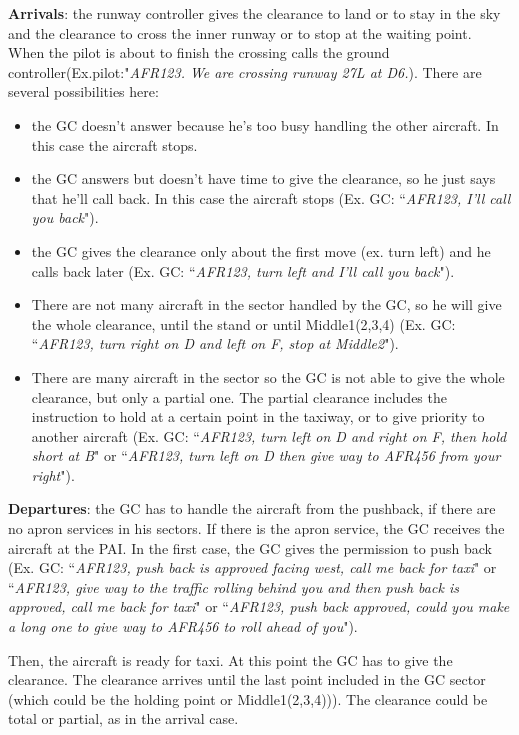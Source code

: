 \documentclass{article}
\begin{document}
\textbf{Arrivals}: the runway controller gives the clearance to land or to stay in the sky and the clearance to cross the inner runway or to stop at the waiting point. When the pilot is about to finish the crossing calls the ground controller(Ex.pilot:"\textit{AFR123. We are crossing runway 27L at D6.}). There are several possibilities here:
\begin{itemize}
	\item the GC doesn't answer because he's too busy handling the other aircraft. In this case the aircraft stops.
	\item the GC answers but doesn't have time to give the clearance, so he just says that he'll call back. In this case the aircraft stops (Ex. GC: ``\textit{AFR123, I'll call you back}").
	\item the GC gives the clearance only about the first move (ex. turn left) and he calls back later (Ex. GC: ``\textit{AFR123, turn left and I'll call you back}").
	\item There are not many aircraft in the sector handled by the GC, so he will give the whole clearance, until the stand or until Middle1(2,3,4) (Ex. GC: ``\textit{AFR123, turn right on D and left on F, stop at Middle2}").
	\item There are many aircraft in the sector so the GC is not able to give the whole clearance, but only a partial one. The partial clearance includes the instruction to hold at a certain point in the taxiway, or to give priority to another aircraft (Ex. GC: ``\textit{AFR123, turn left on D and right on F, then hold short at B}" or ``\textit{AFR123, turn left on D then give way to AFR456 from your right}").
\end{itemize}

\textbf{Departures}: the GC has to handle the aircraft from the pushback, if there are no apron services in his sectors. If there is the apron service, the GC receives the aircraft at the PAI. 
In the first case, the GC gives the permission to push back (Ex. GC: ``\textit{AFR123, push back is approved facing west, call me back for taxi}" or ``\textit{AFR123, give way to the traffic rolling behind you and then push back is approved, call me back for taxi}" or ``\textit{AFR123, push back approved, could you make a long one to give way to AFR456 to roll ahead of you}"). 

Then, the aircraft is ready for taxi. At this point the GC has to give the clearance. The clearance arrives until the last point included in the GC sector (which could be the holding point or Middle1(2,3,4))). The clearance could be total or partial, as in the arrival case.
\end{document}
